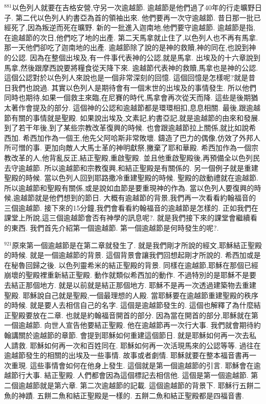 \documentclass{book}
\begin{document}
$^{881}$以色列人就要在吉格安營,守另一次逾越節.
逾越節是他們過了40年的行走曠野日子.
第二代以色列人約書亞為首的領袖出來.
他們要再一次守逾越節.
昔日那一批已經死了,因為叛逆而死在曠野.
新的一批進入迦南地,他們要守逾越節.
逾越節是指,在逾越節的次日,他們吃了地的出產.
第二天馬拿就止住了,以色列人也不再有馬拿.
那一天他們卻吃了迦南地的出產.
逾越節除了說的是神的救贖,神的同在,也說到神的公認.
因為在整個出埃及,有一件事代表神的公認,就是馬拿.
出埃及的十六章說到馬拿,然後跟摩西說要將糧食從天降下來.
逾越節代表神的救贖,馬拿也是神的公認.
這個公認對於以色列人來說也是一個非常深刻的回憶.
這個回憶是怎樣呢?就是昔日我們也說過.
其實以色列人是期待會有一個末世的出埃及的事情發生.
所以他們同時也期待,如果一個救主來臨,在尼賽的時代,馬拿會再次從天而降.
這些是後期猶太著作會提及的部分.
這個神的公認和逾越節都是環環相扣,息息相關.
最後,跟逾越節有關的事情就是聖殿.
如果說出埃及,文素記,約書亞記,就是逾越節的由來和發展.
到了若干年後,到了某些宗教改革復興的時候.
也會跟逾越節拉上關係,就比如說希西加.
希西加作為一個王,他先父阿哈斯非常敗壞.
鑄造了巴力的偶像,仿效了外邦人所可憎的事.
更加向敵人大馬士革的神明獻祭,撇棄了耶和華殿.
希西加作為一個宗教改革的人,他背亂反正,結正聖殿,重啟聖殿.
並且他重啟聖殿後,再預備全以色列民去守逾越節.
所以逾越節和宗教復興,和結正聖殿是有關係的.
另一個例子就是重建聖殿的時候.
當以色列人回到耶路撒冷重建聖殿的時候.
聖殿的啟動禮就在逾越節.
所以逾越節和聖殿有關係,或是說如血節是要重現神的作為.
當以色列人要復興的時候,逾越節就是他們想到的節日.
大概有逾越節的背景,我們再一次看看約翰福音的三個逾越節.
接下來的15分鐘,我們會看看約翰福音的逾越節是怎樣的.
正如我們在課堂上所說,這三個逾越節會否有神學的訊息呢?.
就是我們接下來的課堂會繼續看的東西.
我們首先介紹第一個逾越節.
第一個逾越節是何時發生的呢?.

$^{921}$原來第一個逾越節是在第二章就發生了.
就是我們剛才所說的經文,耶穌結正聖殿的時候.
就是一個逾越節的背景.
這個背景會讓我們回想起剛才所說的.
希西加或是在秘魯回歸之後.
以色列靈希米的結正聖殿的背景.
同樣在逾越節,耶穌在那個已經崩壞的聖殿裡重新結正聖殿.
動作就類似希西加的動作.
不過特別的是耶穌不是要去結正那個地方.
就是以前就是結正那個地方.
耶穌不是再一次透過建築物去重建聖殿.
耶穌說自己就是聖殿,一個最理想的人殿.
當耶穌要在逾越節重建聖殿的秩序的時候.
就是要人去相信自己的名字.
這個是逾越節發生的.
這個也解釋了為什麼結正聖殿要放在二章.
也就是約翰福音開首的部分.
因為當在開首的部分,耶穌就在第一個逾越節.
向世人宣告他要結正聖殿.
他在逾越節再一次行大事.
我們就會期待約翰講關於逾越節的章節.
會提到耶穌如何重建這個節日.
就是耶穌如何再一次去私人請救.
耶穌如何再一次和百姓同在.
耶穌如何再一次活現馬來的公認等等.
過往在逾越節發生的相關的出埃及一些事情.
故事或者劇情.
耶穌就要在整本福音書再一次重現.
這些事情會如何在他身上發生.
這個就是第一個逾越節的引言.
耶穌會在逾越節行大事.
結正聖殿.
人們都會因為這個標記去相信他.
這個是第一個逾越節.
第二個逾越節就是第六章.
第二次逾越節的記載.
這個逾越節的背景下.
耶穌行五餅二魚的神蹟.
五餅二魚和結正聖殿是一樣的.
五餅二魚和結正聖殿都是四福音書.
\end{document}
